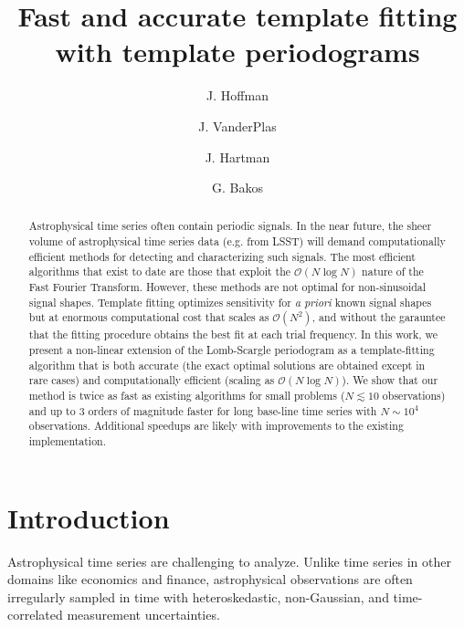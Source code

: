\documentclass[iop]{emulateapj}
\newcommand{\bigO}{\mathcal{O}}
\begin{document}
\title{Fast and accurate template fitting with template periodograms}
\author{J. Hoffman}

\author{J. VanderPlas}

\author{J. Hartman}

\author{G. Bakos}

\begin{abstract}
    Astrophysical time series often contain periodic signals. In the near future,
    the sheer volume of astrophysical time series data (e.g. from LSST) will demand
    computationally efficient methods for detecting and characterizing such signals. 
    The most efficient algorithms that exist to date are those that exploit the $\bigO(N\log N)$ nature of
    the Fast Fourier Transform. However, these methods are not optimal for non-sinusoidal
    signal shapes. Template fitting optimizes sensitivity for \emph{a priori} known
    signal shapes but at enormous computational cost that scales as $\bigO(N^2)$, and without the garauntee
    that the fitting procedure obtains the best fit at each trial frequency. In this work, we present
    a non-linear extension of the Lomb-Scargle periodogram as a template-fitting
    algorithm that is both accurate (the exact optimal solutions are obtained except
    in rare cases) and computationally efficient (scaling as $\bigO(N\log N)$). We show that our method
    is twice as fast as existing algorithms for small problems ($N\lesssim 10$ observations) and
    up to 3 orders of magnitude faster for long base-line time series with $N\sim 10^4$ 
    observations. Additional speedups are likely with improvements to the existing implementation.
\end{abstract}

\section{Introduction}\label{sec:introduction}

Astrophysical time series are challenging to analyze. Unlike
time series in other domains like economics and finance, astrophysical 
observations are often irregularly sampled in time with heteroskedastic, 
non-Gaussian, and time-correlated measurement uncertainties.
\end{document}
